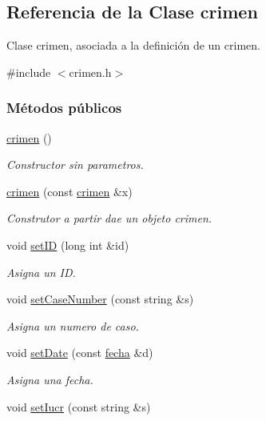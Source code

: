 \hypertarget{classcrimen}{\subsection{Referencia de la Clase crimen}
\label{classcrimen}
}


Clase crimen, asociada a la definición de un crimen.  




{\ttfamily \#include $<$crimen.\+h$>$}

\subsubsection*{Métodos públicos}
\begin{DoxyCompactItemize}
\item 
\hyperlink{classcrimen_ab1147e36869c7e635699e4ef746a7555}{crimen} ()
\begin{DoxyCompactList}\small\item\em Constructor sin parametros. \end{DoxyCompactList}\item 
\hyperlink{classcrimen_a50b783e821c2f5bc829eceb9048c12d7}{crimen} (const \hyperlink{classcrimen}{crimen} \&x)
\begin{DoxyCompactList}\small\item\em Construtor a partir dae un objeto crimen. \end{DoxyCompactList}\item 
void \hyperlink{classcrimen_a2675734f5049f41b5fb5dbc4778df7f8}{set\+I\+D} (long int \&id)
\begin{DoxyCompactList}\small\item\em Asigna un I\+D. \end{DoxyCompactList}\item 
void \hyperlink{classcrimen_a98ee8c42a0ec09c704c5f17e812a6bd5}{set\+Case\+Number} (const string \&s)
\begin{DoxyCompactList}\small\item\em Asigna un numero de caso. \end{DoxyCompactList}\item 
void \hyperlink{classcrimen_ac308c139bb8b599a7badbecd91bfbc5a}{set\+Date} (const \hyperlink{classfecha}{fecha} \&d)
\begin{DoxyCompactList}\small\item\em Asigna una fecha. \end{DoxyCompactList}\item 
void \hyperlink{classcrimen_a9903f49178ad0001f39c03d018b05a2a}{set\+Iucr} (const string \&s)

\end{DoxyCompactItemize}
